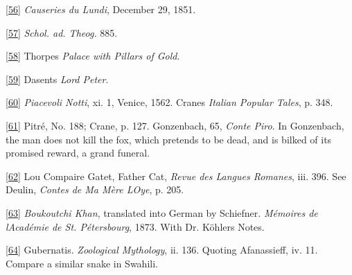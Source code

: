 \documentclass[14pt,a4paper]{memoir}
\begin{document}
\protect\hypertarget{4533318093929944247_33931-h-1.htm.xhtmlux5cux23Footnote_56}{}{}\protect\hyperlink{4533318093929944247_33931-h-0.htm.xhtmlux5cux23FNanchor_56}{{{[}56{]}}}
\emph{Causeries du Lundi}, December 29, 1851.

\protect\hypertarget{4533318093929944247_33931-h-1.htm.xhtmlux5cux23Footnote_57}{}{}\protect\hyperlink{4533318093929944247_33931-h-0.htm.xhtmlux5cux23FNanchor_57}{{{[}57{]}}}
\emph{Schol. ad. Theog.} 885.

\protect\hypertarget{4533318093929944247_33931-h-1.htm.xhtmlux5cux23Footnote_58}{}{}\protect\hyperlink{4533318093929944247_33931-h-0.htm.xhtmlux5cux23FNanchor_58}{{{[}58{]}}}
Thorpe\textquotesingle s \emph{Palace with Pillars of Gold}.

\protect\hypertarget{4533318093929944247_33931-h-1.htm.xhtmlux5cux23Footnote_59}{}{}\protect\hyperlink{4533318093929944247_33931-h-0.htm.xhtmlux5cux23FNanchor_59}{{{[}59{]}}}
Dasent\textquotesingle s \emph{Lord Peter}.

\protect\hypertarget{4533318093929944247_33931-h-1.htm.xhtmlux5cux23Footnote_60}{}{}\protect\hyperlink{4533318093929944247_33931-h-0.htm.xhtmlux5cux23FNanchor_60}{{{[}60{]}}}
\emph{Piacevoli Notti}, xi. 1, Venice, 1562. Crane\textquotesingle s
\emph{Italian Popular Tales}, p. 348.

\protect\hypertarget{4533318093929944247_33931-h-1.htm.xhtmlux5cux23Footnote_61}{}{}\protect\hyperlink{4533318093929944247_33931-h-0.htm.xhtmlux5cux23FNanchor_61}{{{[}61{]}}}
Pitré, No. 188; Crane, p. 127. Gonzenbach, 65, \emph{Conte Piro}. In
Gonzenbach, the man does not kill the fox, which pretends to be dead,
and is bilked of its promised reward, a grand funeral.

\protect\hypertarget{4533318093929944247_33931-h-1.htm.xhtmlux5cux23Footnote_62}{}{}\protect\hyperlink{4533318093929944247_33931-h-0.htm.xhtmlux5cux23FNanchor_62}{{{[}62{]}}}
Lou Compaire Gatet, \textquotesingle Father Cat,\textquotesingle{}
\emph{Revue des Langues Romanes}, iii. 396. See Deulin, \emph{Contes de
Ma Mère L\textquotesingle Oye}, p. 205.

\protect\hypertarget{4533318093929944247_33931-h-1.htm.xhtmlux5cux23Footnote_63}{}{}\protect\hyperlink{4533318093929944247_33931-h-0.htm.xhtmlux5cux23FNanchor_63}{{{[}63{]}}}
\emph{Boukoutchi Khan}, translated into German by Schiefner.
\emph{Mémoires de l\textquotesingle Académie de St. Pétersbourg}, 1873.
With Dr. Köhler\textquotesingle s Notes.

\protect\hypertarget{4533318093929944247_33931-h-1.htm.xhtmlux5cux23Footnote_64}{}{}\protect\hyperlink{4533318093929944247_33931-h-0.htm.xhtmlux5cux23FNanchor_64}{{{[}64{]}}}
Gubernatis. \emph{Zoological Mythology}, ii. 136. Quoting Afanassieff,
iv. 11. Compare a similar snake in Swahili.
\end{document}
